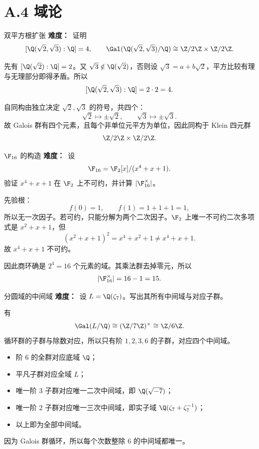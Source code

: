 \section{A.4 域论}

\begin{problem}{双平方根扩张}
\textbf{难度：}\easy\ 证明
\[
[\Q(\sqrt2,\sqrt3):\Q]=4,
\qquad
\Gal(\Q(\sqrt2,\sqrt3)/\Q)\cong \Z/2\Z\times\Z/2\Z.
\]
\end{problem}
\begin{solution}
先有 $[\Q(\sqrt2):\Q]=2$。又 $\sqrt3\notin\Q(\sqrt2)$，否则设 $\sqrt3=a+b\sqrt2$，平方比较有理与无理部分即得矛盾。所以
\[
[\Q(\sqrt2,\sqrt3):\Q]=2\cdot2=4.
\]

自同构由独立决定 $\sqrt2,\sqrt3$ 的符号，共四个：
\[
\sqrt2\mapsto\pm\sqrt2,
\qquad
\sqrt3\mapsto\pm\sqrt3.
\]
故 Galois 群有四个元素，且每个非单位元平方为单位，因此同构于 Klein 四元群
\[
\Z/2\Z\times\Z/2\Z.
\]
\end{solution}

\begin{problem}{$\F_{16}$ 的构造}
\textbf{难度：}\easy\ 设
\[
\F_{16}=\F_2[x]/(x^4+x+1).
\]
验证 $x^4+x+1$ 在 $\F_2$ 上不可约，并计算 $|\F_{16}^\times|$。
\end{problem}
\begin{solution}
先验根：
\[
f(0)=1,\qquad f(1)=1+1+1=1,
\]
所以无一次因子。若可约，只能分解为两个二次因子。$\F_2$ 上唯一不可约二次多项式是 $x^2+x+1$，但
\[
(x^2+x+1)^2=x^4+x^2+1\neq x^4+x+1.
\]
故 $x^4+x+1$ 不可约。

因此商环确是 $2^4=16$ 个元素的域。其乘法群去掉零元，所以
\[
|\F_{16}^\times|=16-1=15.
\]
\end{solution}

\begin{problem}{分圆域的中间域}
\textbf{难度：}\medium\ 设 $L=\Q(\zeta_7)$。写出其所有中间域与对应子群。
\end{problem}
\begin{solution}
有
\[
\Gal(L/\Q)\cong (\Z/7\Z)^\times\cong \Z/6\Z.
\]
循环群的子群与除数对应，所以只有阶 $1,2,3,6$ 的子群，对应四个中间域。

\begin{itemize}
  \item 阶 $6$ 的全群对应底域 $\Q$；
  \item 平凡子群对应全域 $L$；
  \item 唯一阶 $3$ 子群对应唯一二次中间域，即 $\Q(\sqrt{-7})$；
  \item 唯一阶 $2$ 子群对应唯一三次中间域，即实子域 $\Q(\zeta_7+\zeta_7^{-1})$；
  \item 以上即为全部中间域。
\end{itemize}

因为 Galois 群循环，所以每个次数整除 $6$ 的中间域都唯一。
\end{solution}

